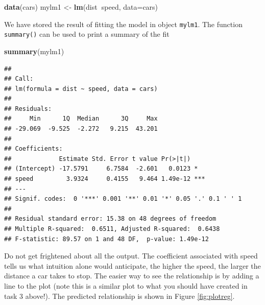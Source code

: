 \documentclass[]{book}
\newenvironment{Shaded}{\begin{snugshade}}{\end{snugshade}}
\newcommand{\KeywordTok}[1]{\textcolor[rgb]{0.13,0.29,0.53}{\textbf{#1}}}
\newcommand{\DataTypeTok}[1]{\textcolor[rgb]{0.13,0.29,0.53}{#1}}
\newcommand{\DecValTok}[1]{\textcolor[rgb]{0.00,0.00,0.81}{#1}}
\newcommand{\StringTok}[1]{\textcolor[rgb]{0.31,0.60,0.02}{#1}}
\newcommand{\OperatorTok}[1]{\textcolor[rgb]{0.81,0.36,0.00}{\textbf{#1}}}
\newcommand{\NormalTok}[1]{#1}
\theoremstyle{definition}
\theoremstyle{definition}
\theoremstyle{remark}
\begin{document}
\begin{Shaded}
\begin{Highlighting}[]
\KeywordTok{data}\NormalTok{(cars)}
\NormalTok{mylm1 <-}\StringTok{ }\KeywordTok{lm}\NormalTok{(dist}\OperatorTok{~}\NormalTok{speed, }\DataTypeTok{data=}\NormalTok{cars)}
\end{Highlighting}
\end{Shaded}

We have stored the result of fitting the model in object \texttt{mylm1}.
The function \texttt{summary()} can be used to print a summary of the
fit

\begin{Shaded}
\begin{Highlighting}[]
\KeywordTok{summary}\NormalTok{(mylm1)}
\end{Highlighting}
\end{Shaded}

\begin{verbatim}
## 
## Call:
## lm(formula = dist ~ speed, data = cars)
## 
## Residuals:
##     Min      1Q  Median      3Q     Max 
## -29.069  -9.525  -2.272   9.215  43.201 
## 
## Coefficients:
##             Estimate Std. Error t value Pr(>|t|)    
## (Intercept) -17.5791     6.7584  -2.601   0.0123 *  
## speed         3.9324     0.4155   9.464 1.49e-12 ***
## ---
## Signif. codes:  0 '***' 0.001 '**' 0.01 '*' 0.05 '.' 0.1 ' ' 1
## 
## Residual standard error: 15.38 on 48 degrees of freedom
## Multiple R-squared:  0.6511, Adjusted R-squared:  0.6438 
## F-statistic: 89.57 on 1 and 48 DF,  p-value: 1.49e-12
\end{verbatim}

Do not get frightened about all the output. The coefficient associated
with speed tells us what intuition alone would anticipate, the higher
the speed, the larger the distance a car takes to stop. The easier way
to see the relationship is by adding a line to the plot (note this is a
similar plot to what you should have created in task 3 above!). The
predicted relationship is shown in Figure \ref{fig:plotreg}.

\begin{Shaded}
\end{Shaded}
\end{document}
